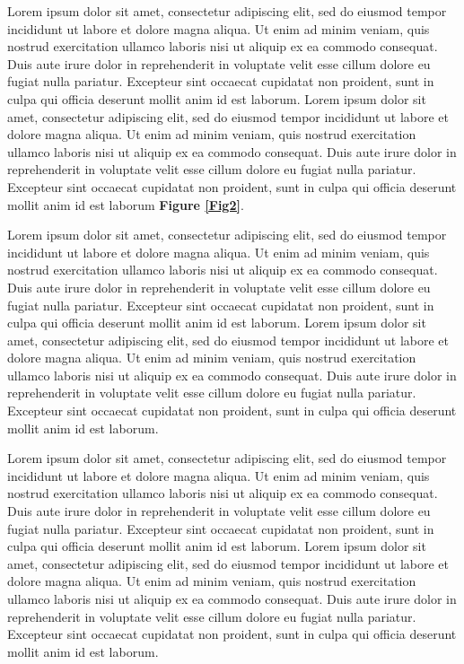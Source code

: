 \documentclass{sbc2025}%
\begin{document}
Lorem ipsum dolor sit amet, consectetur adipiscing elit, sed do eiusmod tempor incididunt ut labore et dolore magna aliqua. Ut enim ad minim veniam, quis nostrud exercitation ullamco laboris nisi ut aliquip ex ea commodo consequat. Duis aute irure dolor in reprehenderit in voluptate velit esse cillum dolore eu fugiat nulla pariatur. Excepteur sint occaecat cupidatat non proident, sunt in culpa qui officia deserunt mollit anim id est laborum. Lorem ipsum dolor sit amet, consectetur adipiscing elit, sed do eiusmod tempor incididunt ut labore et dolore magna aliqua. Ut enim ad minim veniam, quis nostrud exercitation ullamco laboris nisi ut aliquip ex ea commodo consequat. Duis aute irure dolor in reprehenderit in voluptate velit esse cillum dolore eu fugiat nulla pariatur. Excepteur sint occaecat cupidatat non proident, sunt in culpa qui officia deserunt mollit anim id est laborum \textbf{Figure \ref{Fig2}}.

Lorem ipsum dolor sit amet, consectetur adipiscing elit, sed do eiusmod tempor incididunt ut labore et dolore magna aliqua. Ut enim ad minim veniam, quis nostrud exercitation ullamco laboris nisi ut aliquip ex ea commodo consequat. Duis aute irure dolor in reprehenderit in voluptate velit esse cillum dolore eu fugiat nulla pariatur. Excepteur sint occaecat cupidatat non proident, sunt in culpa qui officia deserunt mollit anim id est laborum. Lorem ipsum dolor sit amet, consectetur adipiscing elit, sed do eiusmod tempor incididunt ut labore et dolore magna aliqua. Ut enim ad minim veniam, quis nostrud exercitation ullamco laboris nisi ut aliquip ex ea commodo consequat. Duis aute irure dolor in reprehenderit in voluptate velit esse cillum dolore eu fugiat nulla pariatur. Excepteur sint occaecat cupidatat non proident, sunt in culpa qui officia deserunt mollit anim id est laborum.

Lorem ipsum dolor sit amet, consectetur adipiscing elit, sed do eiusmod tempor incididunt ut labore et dolore magna aliqua. Ut enim ad minim veniam, quis nostrud exercitation ullamco laboris nisi ut aliquip ex ea commodo consequat. Duis aute irure dolor in reprehenderit in voluptate velit esse cillum dolore eu fugiat nulla pariatur. Excepteur sint occaecat cupidatat non proident, sunt in culpa qui officia deserunt mollit anim id est laborum. Lorem ipsum dolor sit amet, consectetur adipiscing elit, sed do eiusmod tempor incididunt ut labore et dolore magna aliqua. Ut enim ad minim veniam, quis nostrud exercitation ullamco laboris nisi ut aliquip ex ea commodo consequat. Duis aute irure dolor in reprehenderit in voluptate velit esse cillum dolore eu fugiat nulla pariatur. Excepteur sint occaecat cupidatat non proident, sunt in culpa qui officia deserunt mollit anim id est laborum.
\end{document}
